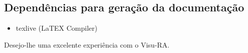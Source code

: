\documentclass[onecolumn,12pt]{article}
\begin{document}
			\subsection{Dependências para \textbf{geração} da \textbf{documentação}}
				\begin{itemize}
					\item texlive	(LaTEX Compiler)
				\end{itemize}
			
	
		\newpage
		\begin{large}
			Desejo-lhe uma excelente experiência com o Visu-RA.
		\end{large}
	
	
	
	
\end{document}
